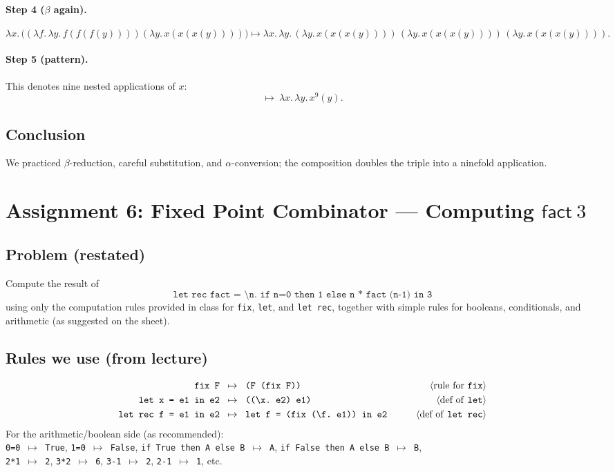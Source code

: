 \documentclass[11pt]{article}
\begin{document}
\paragraph{Step 4 ($\beta$ again).}
\[
  \lambda x.\,\big((\lambda f.\,\lambda y.\,f(f(f(y))))(\lambda y.\,x(x(x(y))))\big)
  \mapsto \lambda x.\,\lambda y.\,(\lambda y.\,x(x(x(y))))\,(\lambda y.\,x(x(x(y))))\,(\lambda y.\,x(x(x(y)))).
\]

\paragraph{Step 5 (pattern).}
This denotes nine nested applications of $x$:
\[
  \mapsto\ \lambda x.\,\lambda y.\,x^9(y).
\]

\subsection*{Conclusion}
We practiced $\beta$-reduction, careful substitution, and $\alpha$-conversion;
the composition doubles the triple into a ninefold application.

\section{Assignment 6: Fixed Point Combinator — Computing \texorpdfstring{$\mathsf{fact}\ 3$}{fact 3}}

\subsection*{Problem (restated)}
Compute the result of
\[
\texttt{let rec fact = \textbackslash n. if n=0 then 1 else n * fact (n-1) in\ 3}
\]
using only the computation rules provided in class for \texttt{fix}, \texttt{let}, and \texttt{let rec}, together with simple
rules for booleans, conditionals, and arithmetic (as suggested on the sheet).

\subsection*{Rules we use (from lecture)}
\begin{align*}
\texttt{fix F} &\;\;\mapsto\;\; \texttt{(F (fix F))} \qquad &\langle\text{rule for \texttt{fix}}\rangle\\
\texttt{let x = e1 in e2} &\;\;\mapsto\;\; \texttt{((\textbackslash x.\ e2)\ e1)} \qquad &\langle\text{def of \texttt{let}}\rangle\\
\texttt{let rec f = e1 in e2} &\;\;\mapsto\;\; \texttt{let f = (fix (\textbackslash f.\ e1)) in e2} \qquad &\langle\text{def of \texttt{let rec}}\rangle
\end{align*}
For the arithmetic/boolean side (as recommended):\\
\texttt{0=0 $\mapsto$ True}, \quad \texttt{1=0 $\mapsto$ False}, \quad
\texttt{if True then A else B $\mapsto$ A}, \quad
\texttt{if False then A else B $\mapsto$ B}, \\
\texttt{2*1 $\mapsto$ 2}, \quad \texttt{3*2 $\mapsto$ 6}, \quad \texttt{3-1 $\mapsto$ 2}, \quad \texttt{2-1 $\mapsto$ 1}, etc.
\end{document}
